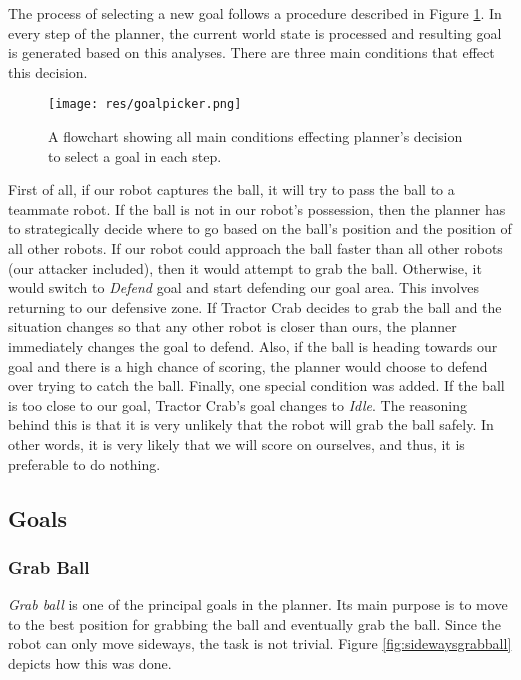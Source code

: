 The process of selecting a new goal follows a procedure described in Figure
\ref{fig:goalpicker}. In every step of the planner, the current world state is
processed and resulting goal is generated based on this analyses. There are
three main conditions that effect this decision.


\begin{figure}[H]
	\begin{center}
    \texttt{[image: res/goalpicker.png]}
    \caption{A flowchart showing all main conditions effecting planner's decision to select a goal in each step.}
    \label{fig:goalpicker}
	\end{center}
\end{figure}

\pagebreak

First of all, if our robot captures the ball, it will try to pass the ball to a
teammate robot. If the ball is not in our robot's possession, then the planner
has to strategically decide where to go based on the ball's position and the
position of all other robots. If our robot could approach the ball faster than
all other robots (our attacker included), then it would attempt to grab the
ball. Otherwise, it would switch to \emph{Defend} goal and start defending our
goal area. This involves returning to our defensive zone. If Tractor Crab
decides to grab the ball and the situation changes so that any other robot is
closer than ours, the planner immediately changes the goal to defend. Also, if
the ball is heading towards our goal and there is a high chance of scoring, the
planner would choose to defend over trying to catch the ball. Finally, one
special condition was added. If the ball is too close to our goal, Tractor
Crab's goal changes to \emph{Idle}. The reasoning behind this is that it is
very unlikely that the robot will grab the ball safely. In other words, it is
very likely that we will score on ourselves, and thus, it is preferable to do
nothing.

\subsection{Goals}


\subsubsection{Grab Ball}

\emph{Grab ball} is one of the principal goals in the planner. Its main purpose
is to move to the best position for grabbing the ball and eventually grab the
ball. Since the robot can only move sideways, the task is not trivial. Figure \ref{fig:sidewaysgrabball} depicts how this was done.

